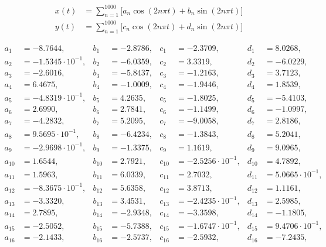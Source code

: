 \begin{align*}
x(t) &= \sum\limits_{n=1}^{ 1000 } \Big[a_n \cos(2n\pi t) + b_n \sin(2n\pi t) \Big]\\ 
y(t) &= \sum\limits_{n=1}^{ 1000 } \Big[c_n \cos(2n\pi t) + d_n \sin(2n\pi t) \Big]
\end{align*}

\begin{align*}
  a_{ 1 } &= -8.7644, & b_{ 1 } &= -2.8786, & c_{ 1 } &= -2.3709, & d_{ 1 } &= 8.0268, \\ 
  a_{ 2 } &= -1.5345 \cdot 10^{ -1 }, & b_{ 2 } &= -6.0359, & c_{ 2 } &= 3.3319, & d_{ 2 } &= -6.0229, \\ 
  a_{ 3 } &= -2.6016, & b_{ 3 } &= -5.8437, & c_{ 3 } &= -1.2163, & d_{ 3 } &= 3.7123, \\ 
  a_{ 4 } &= 6.4675, & b_{ 4 } &= -1.0009, & c_{ 4 } &= -1.9446, & d_{ 4 } &= 1.8539, \\ 
  a_{ 5 } &= -4.8319 \cdot 10^{ -1 }, & b_{ 5 } &= 4.2635, & c_{ 5 } &= -1.8025, & d_{ 5 } &= -5.4103, \\ 
  a_{ 6 } &= 2.6990, & b_{ 6 } &= 2.7841, & c_{ 6 } &= -1.1499, & d_{ 6 } &= -1.0997, \\ 
  a_{ 7 } &= -4.2832, & b_{ 7 } &= 5.2095, & c_{ 7 } &= -9.0058, & d_{ 7 } &= 2.8186, \\ 
  a_{ 8 } &= 9.5695 \cdot 10^{ -1 }, & b_{ 8 } &= -6.4234, & c_{ 8 } &= -1.3843, & d_{ 8 } &= 5.2041, \\ 
  a_{ 9 } &= -2.9698 \cdot 10^{ -1 }, & b_{ 9 } &= -1.3375, & c_{ 9 } &= 1.1619, & d_{ 9 } &= 9.0965, \\ 
  a_{ 10 } &= 1.6544, & b_{ 10 } &= 2.7921, & c_{ 10 } &= -2.5256 \cdot 10^{ -1 }, & d_{ 10 } &= 4.7892, \\ 
  a_{ 11 } &= 1.5963, & b_{ 11 } &= 6.0339, & c_{ 11 } &= 2.7032, & d_{ 11 } &= 5.0665 \cdot 10^{ -1 }, \\ 
  a_{ 12 } &= -8.3675 \cdot 10^{ -1 }, & b_{ 12 } &= 5.6358, & c_{ 12 } &= 3.8713, & d_{ 12 } &= 1.1161, \\ 
  a_{ 13 } &= -3.3320, & b_{ 13 } &= 3.4531, & c_{ 13 } &= -2.4235 \cdot 10^{ -1 }, & d_{ 13 } &= 2.5985, \\ 
  a_{ 14 } &= 2.7895, & b_{ 14 } &= -2.9348, & c_{ 14 } &= -3.3598, & d_{ 14 } &= -1.1805, \\ 
  a_{ 15 } &= -2.5052, & b_{ 15 } &= -5.7388, & c_{ 15 } &= -1.6747 \cdot 10^{ -1 }, & d_{ 15 } &= 9.4706 \cdot 10^{ -1 }, \\ 
  a_{ 16 } &= -2.1433, & b_{ 16 } &= -2.5737, & c_{ 16 } &= -2.5932, & d_{ 16 } &= -7.2435, \\ 

\end{align*}
